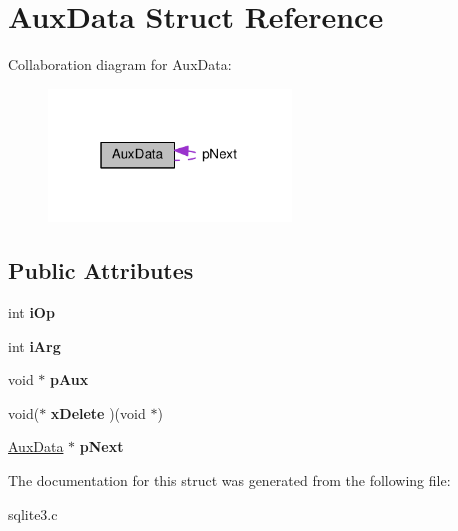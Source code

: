 \hypertarget{structAuxData}{}\section{Aux\+Data Struct Reference}
\label{structAuxData}


Collaboration diagram for Aux\+Data\+:\nopagebreak
\begin{figure}[H]
\begin{center}
\leavevmode
\includegraphics[width=183pt]{structAuxData__coll__graph}
\end{center}
\end{figure}
\subsection*{Public Attributes}
\begin{DoxyCompactItemize}
\item 
int {\bfseries i\+Op}\hypertarget{structAuxData_aaa45d5e867df81e58b886f4fe355364f}{}\label{structAuxData_aaa45d5e867df81e58b886f4fe355364f}

\item 
int {\bfseries i\+Arg}\hypertarget{structAuxData_aa0f1b63cbd4f0cf17c82d9ed17bbdc01}{}\label{structAuxData_aa0f1b63cbd4f0cf17c82d9ed17bbdc01}

\item 
void $\ast$ {\bfseries p\+Aux}\hypertarget{structAuxData_a3867fd2bd1f3795b14e858daa6754825}{}\label{structAuxData_a3867fd2bd1f3795b14e858daa6754825}

\item 
void($\ast$ {\bfseries x\+Delete} )(void $\ast$)\hypertarget{structAuxData_ae2c39019bc42d3650d21d9b4f8692400}{}\label{structAuxData_ae2c39019bc42d3650d21d9b4f8692400}

\item 
\hyperlink{structAuxData}{Aux\+Data} $\ast$ {\bfseries p\+Next}\hypertarget{structAuxData_af63a17e0ce6af2de969caccb25ef3945}{}\label{structAuxData_af63a17e0ce6af2de969caccb25ef3945}

\end{DoxyCompactItemize}


The documentation for this struct was generated from the following file\+:\begin{DoxyCompactItemize}
\item 
sqlite3.\+c\end{DoxyCompactItemize}
